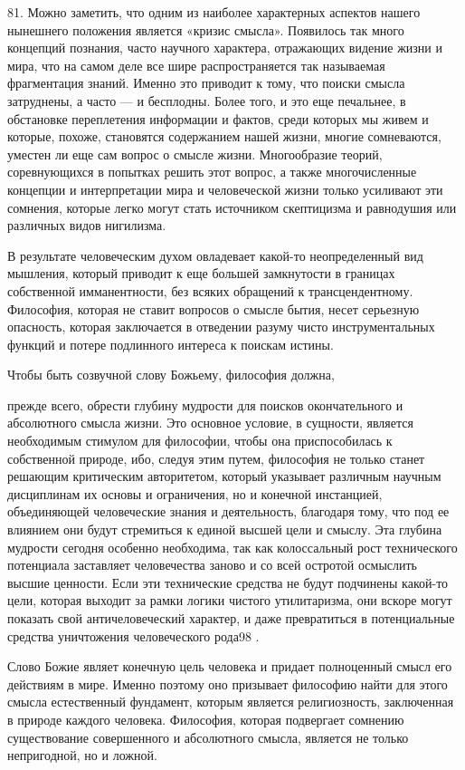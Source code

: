 \documentclass[a5paper,10pt]{article}
\begin{document}
81. Можно заметить, что одним из наиболее характерных аспектов нашего нынешнего
положения является «кризис смысла». Появилось так много концепций познания,
часто научного характера, отражающих видение жизни и мира, что на самом деле
все шире распространяется так называемая фрагментация знаний. Именно это
приводит к тому, что поиски смысла затруднены, а часто — и бесплодны. Более
того, и это еще печальнее, в обстановке переплетения информации и фактов, среди
которых мы живем и которые, похоже, становятся содержанием нашей жизни, многие
сомневаются, уместен ли еще сам вопрос о смысле жизни. Многообразие теорий,
соревнующихся в попытках решить этот вопрос, а также многочисленные концепции и
интерпретации мира и человеческой жизни только усиливают эти сомнения, которые
легко могут стать источником скептицизма и равнодушия или различных видов
нигилизма.

В результате человеческим духом овладевает какой-то неопределенный вид
мышления, который приводит к еще большей замкнутости в границах собственной
имманентности, без всяких обращений к трансцендентному. Философия, которая не
ставит вопросов о смысле бытия, несет серьезную опасность, которая заключается
в отведении разуму чисто инструментальных функций и потере подлинного интереса
к поискам истины.

Чтобы быть созвучной слову Божьему, философия должна,

прежде всего, обрести глубину мудрости для поисков окончательного и абсолютного
смысла жизни. Это основное условие, в сущности, является необходимым стимулом
для философии, чтобы она приспособилась к собственной природе, ибо, следуя этим
путем, философия не только станет решающим критическим авторитетом, который
указывает различным научным дисциплинам их основы и ограничения, но и конечной
инстанцией, объединяющей человеческие знания и деятельность, благодаря тому,
что под ее влиянием они будут стремиться к единой высшей цели и смыслу. Эта
глубина мудрости сегодня особенно необходима, так как колоссальный рост
технического потенциала заставляет человечества заново и со всей остротой
осмыслить высшие ценности. Если эти технические средства не будут подчинены
какой-то цели, которая выходит за рамки логики чистого утилитаризма, они вскоре
могут показать свой античеловеческий характер, и даже превратиться в
потенциальные средства уничтожения человеческого рода98 .

Слово Божие являет конечную цель человека и придает полноценный смысл его
действиям в мире. Именно поэтому оно призывает философию найти для этого смысла
естественный фундамент, которым является религиозность, заключенная в природе
каждого человека. Философия, которая подвергает сомнению существование
совершенного и абсолютного смысла, является не только непригодной, но и ложной.
\end{document}
